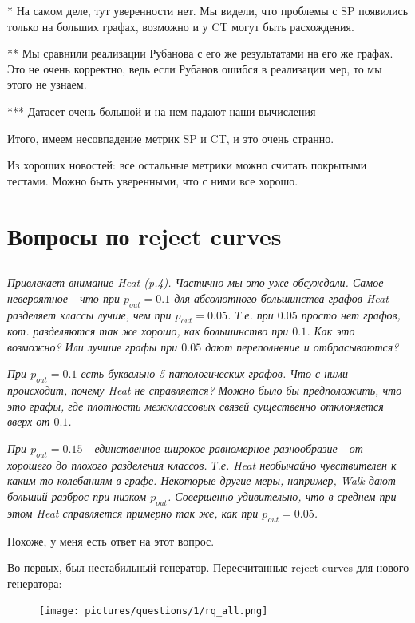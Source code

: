 \documentclass{article}
\begin{document}
{
\small
* На самом деле, тут уверенности нет. Мы видели, что проблемы с SP появились только на больших графах, возможно и у CT могут быть расхождения.

** Мы сравнили реализации Рубанова с его же результатами на его же графах. Это не очень корректно, ведь если Рубанов ошибся в реализации мер, то мы этого не узнаем.

*** Датасет очень большой и на нем падают наши вычисления
}

\medskip

Итого, имеем несовпадение метрик SP и CT, и это очень странно. 

Из хороших новостей: все остальные метрики можно считать покрытыми тестами. Можно быть уверенными, что с ними все хорошо.


\newpage
\section{Вопросы по reject curves}

\subsection{}
\textit{Привлекает внимание Heat (p.4). Частично мы это уже обсуждали. Самое невероятное - что при $p_{out} = 0.1$ для абсолютного большинства графов Heat разделяет классы лучше, чем при $p_{out} = 0.05$. Т.е. при $0.05$ просто нет графов, кот. разделяются так же хорошо, как большинство при $0.1$. Как это возможно? Или лучшие графы при $0.05$ дают переполнение и отбрасываются?}
	
\textit{При $p_{out} = 0.1$ есть буквально 5 патологических графов. Что с ними происходит, почему Heat не справляется? Можно было бы предположить, что это графы, где плотность межклассовых связей существенно отклоняется вверх от $0.1$.}
	
\textit{При $p_{out} = 0.15$ - единственное широкое равномерное разнообразие - от хорошего до плохого разделения классов. Т.е. Heat необычайно чувствителен к каким-то колебаниям в графе. Некоторые другие меры, например, Walk дают больший разброс при низком $p_{out}$. Совершенно удивительно, что в среднем при этом Heat справляется примерно так же, как при $p_{out} = 0.05$.}

Похоже, у меня есть ответ на этот вопрос. 

Во-первых, был нестабильный генератор. Пересчитанные reject curves для нового генератора:

\begin{figure}[H]
	\texttt{[image: pictures/questions/1/rq\_all.png]}
	\caption{\label{f_vs2}}
\end{figure}
\end{document}
